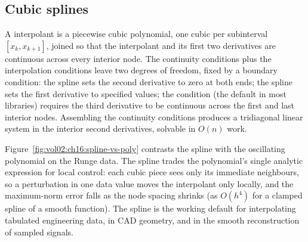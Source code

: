 \subsection{Cubic splines}

A  interpolant is a piecewise cubic
polynomial, one cubic per subinterval $[x_{k}, x_{k+1}]$, joined so
that the interpolant and its first two derivatives are continuous
across every interior node. The continuity conditions plus the
interpolation conditions leave two degrees of freedom, fixed by a
boundary condition: the  spline sets the second
derivative to zero at both ends; the  spline sets
the first derivative to specified values; the 
condition (the default in most libraries) requires the third
derivative to be continuous across the first and last interior
nodes. Assembling the continuity conditions produces a tridiagonal
linear system in the interior second derivatives, solvable in
$O(n)$ work.



Figure~\ref{fig:vol02:ch16:spline-vs-poly} contrasts the spline
with the oscillating polynomial on the Runge data. The spline trades
the polynomial's single analytic expression for local control: each
cubic piece sees only its immediate neighbours, so a perturbation in
one data value moves the interpolant only locally, and the
maximum-norm error falls as the node spacing shrinks (as $O(h^{4})$
for a clamped spline of a smooth function). The spline is the
working default for interpolating tabulated engineering data, in CAD
geometry, and in the smooth reconstruction of sampled signals.

